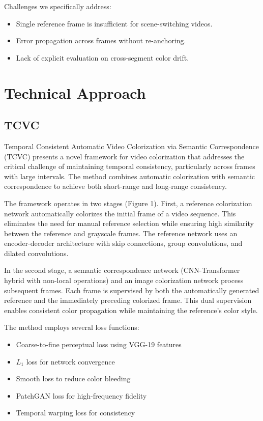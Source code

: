 \documentclass[10pt,twocolumn,letterpaper]{article}
\begin{document}
Challenges we specifically address:
\begin{itemize}
    \item Single reference frame is insufficient for scene-switching videos.
    \item Error propagation across frames without re-anchoring.
    \item Lack of explicit evaluation on cross-segment color drift.
\end{itemize}



\section{Technical Approach}
\subsection{TCVC \cite{zhang2023temporal}}
Temporal Consistent Automatic Video Colorization via Semantic Correspondence (TCVC) \cite{zhang2023temporal} presents a novel framework for video colorization that addresses the critical challenge of maintaining temporal consistency, particularly across frames with large intervals. The method combines automatic colorization with semantic correspondence to achieve both short-range and long-range consistency.

The framework operates in two stages (Figure 1). First, a reference colorization network automatically colorizes the initial frame of a video sequence. This eliminates the need for manual reference selection while ensuring high similarity between the reference and grayscale frames. The reference network uses an encoder-decoder architecture with skip connections, group convolutions, and dilated convolutions.

In the second stage, a semantic correspondence network (CNN-Transformer hybrid with non-local operations) and an image colorization network process subsequent frames. Each frame is supervised by both the automatically generated reference and the immediately preceding colorized frame. This dual supervision enables consistent color propagation while maintaining the reference's color style.

The method employs several loss functions:
\begin{itemize}
\item Coarse-to-fine perceptual loss using VGG-19 features
\item $L_1$ loss for network convergence
\item Smooth loss to reduce color bleeding
\item PatchGAN loss for high-frequency fidelity
\item Temporal warping loss for consistency
\end{itemize}
\end{document}
